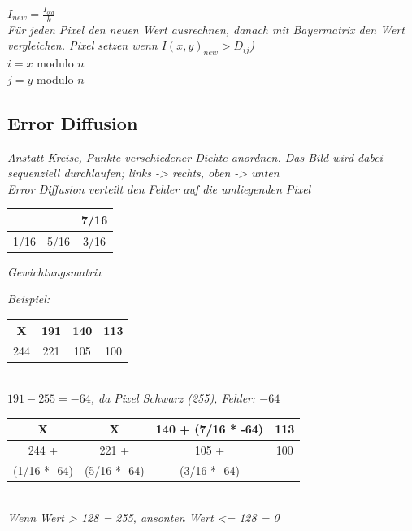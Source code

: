 $I_{new} = \frac{I_{old}}{k}$ \\
\textit{
    Für jeden Pixel den neuen Wert ausrechnen,
    danach mit Bayermatrix den Wert vergleichen.
    Pixel setzen wenn $I(x,y)_{new} > D_{ij}$)
} \\

$i = x$ modulo $n$ \\
$j = y$ modulo $n$ \\

\subsection{Error Diffusion}

\textit{
    Anstatt Kreise, Punkte verschiedener Dichte anordnen.
    Das Bild wird dabei sequenziell durchlaufen; links -> rechts, oben -> unten
} \\
\textit{Error Diffusion verteilt den Fehler auf die umliegenden Pixel} \\

\begin{tabular}{|c|c|c|}
    \hline
    & & 7/16 \\
    \hline
    1/16 & 5/16 & 3/16 \\
    \hline
\end{tabular}

\textit{Gewichtungsmatrix}

\textit{Beispiel:}

\begin{tabular}{|c|c|c|c|}
    \hline
    X & 191 & 140 & 113 \\
    \hline
    244 & 221 & 105 & 100 \\
    \hline
\end{tabular} \\

\textit{$191 - 255 = -64$, da Pixel Schwarz (255), Fehler: $-64$}

\begin{tabular}{|c|c|c|c|}
    \hline
    X & X & 140 + (7/16 * -64) & 113 \\
    \hline
    244 + & 221 + & 105 + & 100 \\
    (1/16 * -64) & (5/16 * -64) & (3/16 * -64) & \\
    \hline
\end{tabular} \\

\textit{Wenn Wert > 128 = 255, ansonten Wert <= 128 = 0}